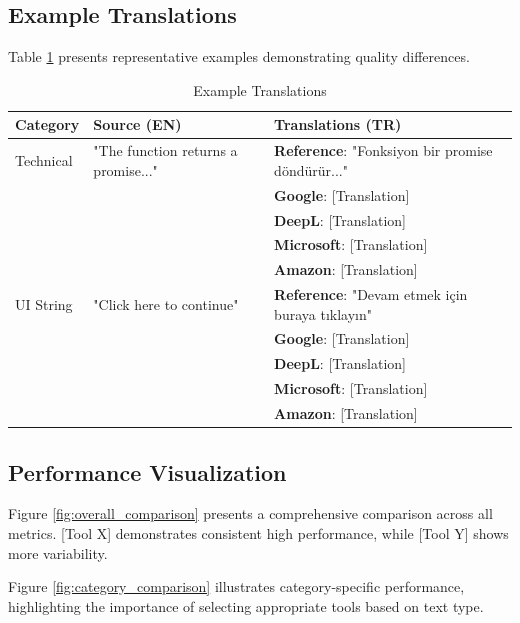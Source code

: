 \subsection{Example Translations}

Table \ref{tab:examples} presents representative examples demonstrating quality differences.

\begin{table}[t]
\centering
\caption{Example Translations}
\label{tab:examples}
\begin{tabular}{@{}p{}p{}p{}@{}}
\toprule
\textbf{Category} & \textbf{Source (EN)} & \textbf{Translations (TR)} \\ \midrule
Technical & "The function returns a promise..." & 
\textbf{Reference}: "Fonksiyon bir promise döndürür..." \\
& & \textbf{Google}: [Translation] \\
& & \textbf{DeepL}: [Translation] \\
& & \textbf{Microsoft}: [Translation] \\
& & \textbf{Amazon}: [Translation] \\ \midrule
UI String & "Click here to continue" & 
\textbf{Reference}: "Devam etmek için buraya tıklayın" \\
& & \textbf{Google}: [Translation] \\
& & \textbf{DeepL}: [Translation] \\
& & \textbf{Microsoft}: [Translation] \\
& & \textbf{Amazon}: [Translation] \\ \bottomrule
\end{tabular}
\end{table}

\subsection{Performance Visualization}

Figure \ref{fig:overall_comparison} presents a comprehensive comparison across all metrics. [Tool X] demonstrates consistent high performance, while [Tool Y] shows more variability.

Figure \ref{fig:category_comparison} illustrates category-specific performance, highlighting the importance of selecting appropriate tools based on text type.
